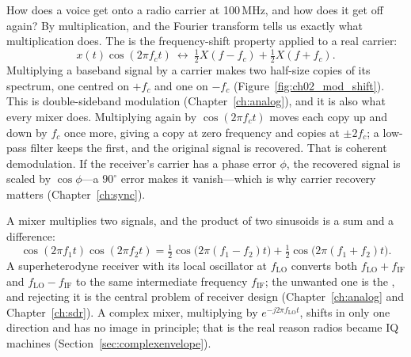 How does a voice get onto a radio carrier at 100\,MHz, and how does it get off again? By
multiplication, and the Fourier transform tells us exactly what multiplication does. The
 is the frequency-shift property applied to a real carrier:
\begin{equation}
x(t)\cos(2\pi f_ct)\ \leftrightarrow\ \tfrac12X(f-f_c)+\tfrac12X(f+f_c).
\label{eq:ch02:modthm}
\end{equation}
Multiplying a baseband signal by a carrier makes two half-size copies of its spectrum, one centred
on $+f_c$ and one on $-f_c$ (Figure~\ref{fig:ch02_mod_shift}). This is double-sideband modulation
(Chapter~\ref{ch:analog}), and it is also what every mixer does. Multiplying again by
$\cos(2\pi f_ct)$ moves each copy up and down by $f_c$ once more, giving a copy at zero frequency and
copies at $\pm2f_c$; a low-pass filter keeps the first, and the original signal is recovered. That is
coherent demodulation. If the receiver's carrier has a phase error $\phi$, the recovered signal is
scaled by $\cos\phi$---a $90^\circ$ error makes it vanish---which is why carrier recovery matters
(Chapter~\ref{ch:sync}).


A mixer multiplies two signals, and the product of two sinusoids is a sum and a difference:
\begin{equation}
\cos(2\pi f_1t)\cos(2\pi f_2t)=\tfrac12\cos\big(2\pi(f_1-f_2)t\big)+\tfrac12\cos\big(2\pi(f_1+f_2)t\big).
\end{equation}
A superheterodyne receiver with its local oscillator at $f_{\mathrm{LO}}$ converts both
$f_{\mathrm{LO}}+f_{\mathrm{IF}}$ and $f_{\mathrm{LO}}-f_{\mathrm{IF}}$ to the same intermediate frequency
$f_{\mathrm{IF}}$; the unwanted one is the , and rejecting it is the central problem of
receiver design (Chapter~\ref{ch:analog} and Chapter~\ref{ch:sdr}). A complex mixer, multiplying by
$e^{-j2\pi f_{\mathrm{LO}}t}$, shifts in only one direction and has no image in principle; that is
the real reason radios became IQ machines (Section~\ref{sec:complexenvelope}).

